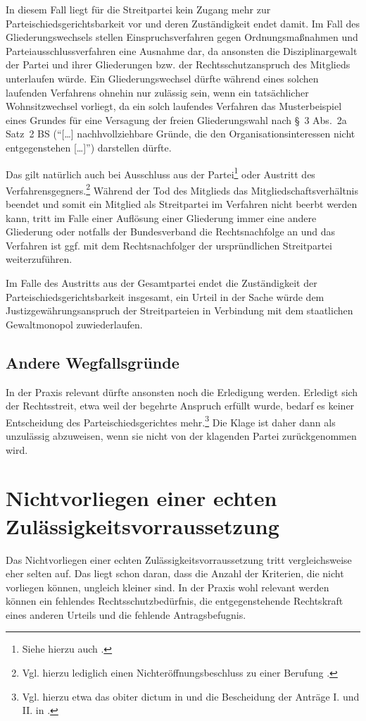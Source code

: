 In diesem Fall liegt für die Streitpartei kein Zugang mehr zur Parteischiedsgerichtsbarkeit vor und deren Zuständigkeit endet damit.
Im Fall des Gliederungswechsels stellen Einspruchsverfahren gegen Ordnungsmaßnahmen und Parteiausschlussverfahren eine Ausnahme dar, da ansonsten die Disziplinargewalt der Partei und ihrer Gliederungen bzw. der Rechtsschutzanspruch des Mitglieds unterlaufen würde.
Ein Gliederungswechsel dürfte während eines solchen laufenden Verfahrens ohnehin nur zulässig sein, wenn ein tatsächlicher Wohnsitzwechsel vorliegt, da ein solch laufendes Verfahren das Musterbeispiel eines Grundes für eine Versagung der freien Gliederungswahl nach \S~3 Abs.~2a Satz~2 BS (\enquote{[\dots] nachhvollziehbare Gründe, die den Organisationsinteressen nicht entgegenstehen [\dots]}) darstellen dürfte.

Das gilt natürlich auch bei Ausschluss aus der Partei\footnote{Siehe hierzu auch \cite{BSG2314HS}.} oder Austritt des Verfahrensgegners.\footnote{Vgl. hierzu lediglich einen Nichteröffnungsbeschluss zu einer Berufung \cite{BSG2214HS}.}
Während der Tod des Mitglieds das Mitgliedschaftsverhältnis beendet und somit ein Mitglied als Streitpartei im Verfahren nicht beerbt werden kann, tritt im Falle einer Auflösung einer Gliederung immer eine andere Gliederung oder notfalls der Bundesverband die Rechtsnachfolge an und das Verfahren ist ggf. mit dem Rechtsnachfolger der urspründlichen Streitpartei weiterzuführen.

Im Falle des Austritts aus der Gesamtpartei endet die Zuständigkeit der Parteischiedsgerichtsbarkeit insgesamt, ein Urteil in der Sache würde dem Justizgewährungsanspruch der Streitparteien in Verbindung mit dem staatlichen Gewaltmonopol zuwiederlaufen.

\subsection{Andere Wegfallsgründe}
\label{Zulaessigkeit:Wegfall:Anderes}
In der Praxis relevant dürfte ansonsten noch die Erledigung werden.
Erledigt sich der Rechtsstreit, etwa weil der begehrte Anspruch erfüllt wurde, bedarf es keiner Entscheidung des Parteischiedsgerichtes mehr.\footnote{Vgl. hierzu etwa das obiter dictum in \cite{BSG1714HS} und die Bescheidung der Anträge I. und II. in \cite{BSG2114HS}.}
Die Klage ist daher dann als unzulässig abzuweisen, wenn sie nicht von der klagenden Partei zurückgenommen wird.


\section{Nichtvorliegen einer echten Zulässigkeitsvorraussetzung}
\label{Zulaessigkeit:Nichtvorliegen}
Das Nichtvorliegen einer echten Zulässigkeitsvorraussetzung tritt vergleichsweise eher selten auf.
Das liegt schon daran, dass die Anzahl der Kriterien, die nicht vorliegen können, ungleich kleiner sind.
In der Praxis wohl relevant werden können ein fehlendes Rechtsschutzbedürfnis, die entgegenstehende Rechtskraft eines anderen Urteils und die fehlende Antragsbefugnis.

